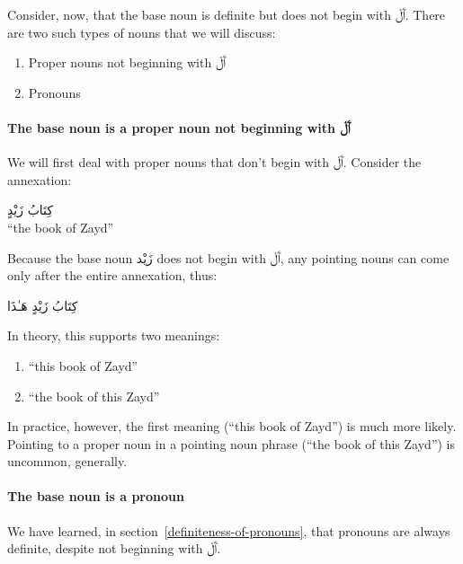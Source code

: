 \documentclass[
  10pt,
]{book}
\providecommand{\tightlist}{%
  \setlength{\itemsep}{0pt}\setlength{\parskip}{0pt}}
\begin{document}
Consider, now, that the base noun is definite but does not begin with \foreignlanguage{arabic}{ٱَلْ}. There are two such types of nouns that we will discuss:

\begin{enumerate}
\def\labelenumi{\roman{enumi}.}
\tightlist
\item
  Proper nouns not beginning with \foreignlanguage{arabic}{ٱَلْ}
\item
  Pronouns
\end{enumerate}

\paragraph{\texorpdfstring{The base noun is a proper noun not beginning with \foreignlanguage{arabic}{ٱَلْ}}{The base noun is a proper noun not beginning with ٱَلْ}}\label{the-base-noun-is-a-proper-noun-not-beginning-with-ux671ux644}

We will first deal with proper nouns that don't begin with \foreignlanguage{arabic}{ٱَلْ}.
Consider the annexation:

\foreignlanguage{arabic}{کِتَابُ زَيْدٍ}\\
\enquote{the book of Zayd}

Because the base noun \foreignlanguage{arabic}{زَيْد} does not begin with \foreignlanguage{arabic}{ٱَلْ}, any pointing nouns can come only after the entire annexation, thus:

\foreignlanguage{arabic}{کِتَابُ زَيْدٍ هَـٰذَا}

In theory, this supports two meanings:

\begin{enumerate}
\def\labelenumi{\roman{enumi}.}
\tightlist
\item
  \enquote{this book of Zayd}
\item
  \enquote{the book of this Zayd}
\end{enumerate}

In practice, however, the first meaning
(\enquote{this book of Zayd})
is much more likely.
Pointing to a proper noun in a pointing noun phrase
(\enquote{the book of this Zayd})
is uncommon, generally.

\paragraph{The base noun is a pronoun}\label{the-base-noun-is-a-pronoun}

We have learned, in
section~\ref{definiteness-of-pronouns},
that pronouns are always definite, despite not beginning with \foreignlanguage{arabic}{ٱَلْ}.
\end{document}
